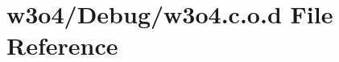 \hypertarget{w3o4_8c_8o_8d}{}\section{w3o4/\+Debug/w3o4.c.\+o.\+d File Reference}
\label{w3o4_8c_8o_8d}
